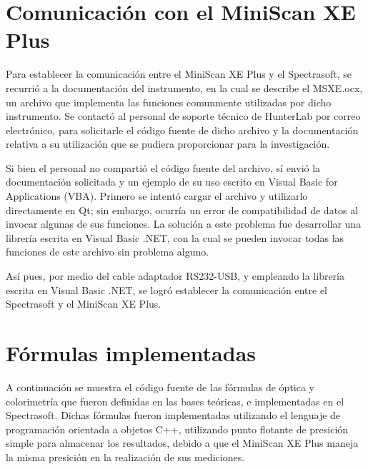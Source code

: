 \section{Comunicaci\'{o}n con el MiniScan XE Plus}

	Para establecer la comunicaci\'{o}n entre el MiniScan XE Plus y el Spectrasoft, se recurri\'{o} a la documentaci\'{o}n del instrumento, en la cual se describe el MSXE.ocx, un archivo que implementa las funciones comunmente utilizadas por dicho instrumento. Se contact\'{o} al personal de soporte t\'{e}cnico de HunterLab por correo electr\'{o}nico, para solicitarle el c\'{o}digo fuente de dicho archivo y la documentaci\'{o}n relativa a su utilizaci\'{o}n que se pudiera proporcionar para la investigaci\'{o}n.
	
	Si bien el personal no comparti\'{o} el c\'{o}digo fuente del archivo, s\'{i} envi\'{o} la documentaci\'{o}n solicitada y un ejemplo de su uso escrito en Visual Basic for Applications (VBA). Primero se intent\'{o} cargar el archivo y utilizarlo directamente en Qt; sin embargo, ocurr\'{i}a un error de compatibilidad de datos al invocar algunas de sus funciones. La soluci\'{o}n a este problema fue desarrollar una librer\'{i}a escrita en Visual Basic .NET, con la cual se pueden invocar todas las funciones de este archivo sin problema alguno.

	As\'{i} pues, por medio del cable adaptador RS232-USB, y empleando la librer\'{i}a escrita en Visual Basic .NET, se logr\'{o} establecer la comunicaci\'{o}n entre el Spectrasoft y el MiniScan XE Plus.
\newpage
\section{F\'{o}rmulas implementadas}
	A continuaci\'{o}n se muestra el c\'{o}digo fuente de las f\'{o}rmulas de \'{o}ptica y colorimetr\'{i}a que fueron definidas en las bases te\'{o}ricas, e implementadas en el Spectrasoft. Dichas f\'{o}rmulas fueron implementadas utilizando el lenguaje de programaci\'{o}n orientada a objetos C++, utilizando punto flotante de presici\'{o}n simple para almacenar los resultados, debido a que el MiniScan XE Plus maneja la misma presici\'{o}n en la realizaci\'{o}n de sus mediciones.
	
